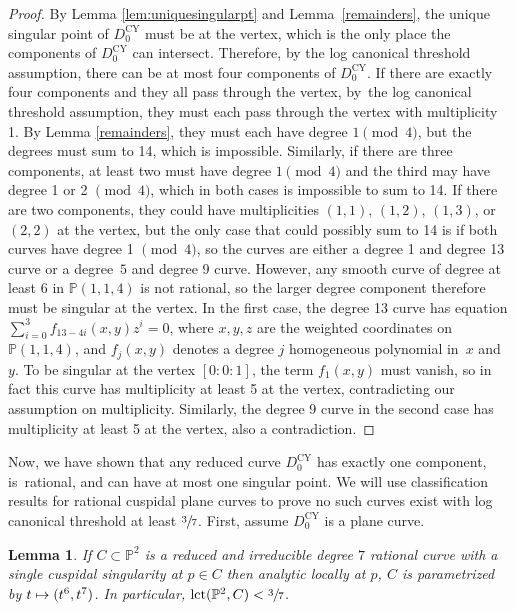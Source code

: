 \documentclass[JEP,XML,SOM,Unicode,NoFloatCountersInSection,published]{cedram}
\newcommand\mto{\mathchoice{\longmapsto}{\mapsto}{\mapsto}{\mapsto}}
\theoremstyle{plain}
\newtheorem{lemma}[theorem]{Lemma}
\theoremstyle{definition}
\newcommand\PP{{\mathbb{P}}}
\newcommand\lct{\mathrm{lct}}
\newcommand\Dcyo{{D^{\mathrm{CY}}_0}}
\begin{document}
\begin{proof}
By Lemma \ref{lem:uniquesingularpt} and Lemma~\ref{remainders}, the unique singular point of $\Dcyo$ must be at the vertex, which is the only place the components of $\Dcyo$ can intersect. Therefore, by the log canonical threshold assumption, there can be at most four components of $\Dcyo$. If there are exactly four components and they all pass through the vertex, by~the log canonical threshold assumption, they must each pass through the vertex with multiplicity 1. By Lemma \ref{remainders}, they must each have degree $1 \pmod 4$, but the degrees must sum to 14, which is impossible. Similarly, if there are three components, at least two must have degree $1 \pmod 4$ and the third may have degree 1 or 2 $\pmod 4$, which in both cases is impossible to sum to 14. If there are two components, they could have multiplicities $(1,1)$, $(1,2)$, $(1,3)$, or $(2,2)$ at the vertex, but the only case that could possibly sum to 14 is if both curves have degree 1 $\pmod 4$, so the curves are either a degree 1 and degree 13 curve or a degree~$5$ and degree 9 curve. However, any smooth curve of degree at least 6 in $\PP(1,1,4)$ is not rational, so the larger degree component therefore must be singular at the vertex. In the first case, the degree 13 curve has equation $\sum_{i = 0}^3 f_{13-4i}(x,y)z^i = 0$, where $x,y,z$ are the weighted coordinates on $\PP(1,1,4)$, and $f_j(x,y)$ denotes a degree $j$ homogeneous polynomial in~$x$ and~$y$. To be singular at the vertex $[0:0:1]$, the term $f_{1}(x,y)$ must vanish, so in fact this curve has multiplicity at least 5 at the vertex, contradicting our assumption on multiplicity. Similarly, the degree 9 curve in the second case has multiplicity at least 5 at the vertex, also a contradiction.
\end{proof}

Now, we have shown that any reduced curve $\Dcyo$ has exactly one component, is~rational, and can have at most one singular point. We will use classification results for rational cuspidal plane curves to prove no such curves exist with log canonical threshold at least $\sfrac{3}{7}$. First, assume $\Dcyo$ is a plane curve.

\begin{lemma}\label{oneredcom}
If $C\subset\PP^2$ is a reduced and irreducible degree $7$ rational curve with a single cuspidal singularity at $p \in C$ then analytic locally at $p$, $C$ is parametrized by $t\mto (t^6,t^7)$. In particular, $\lct(\PP^2,C) < \sfrac{3}{7}$.
\end{lemma}
\end{document}
